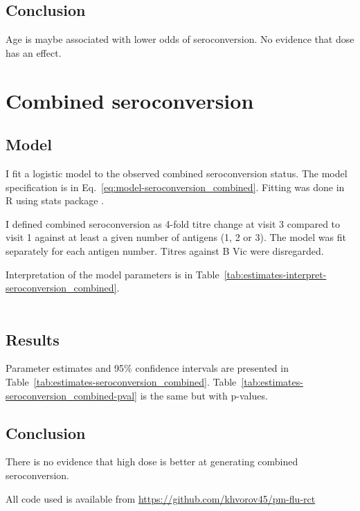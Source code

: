 \documentclass[11pt]{article}
\begin{document}
\subsection{Conclusion}

Age is maybe associated with lower odds of seroconversion. No evidence that
dose has an effect.

\section{Combined seroconversion}

\subsection{Model}

I fit a logistic model to the observed combined seroconversion status.
The model specification is in Eq.~\ref{eq:model-seroconversion_combined}.
Fitting was done in R using stats package \cite{R}.

I defined combined seroconversion as 4-fold titre change at visit 3 compared
to visit 1 against
at least a given number of antigens (1, 2 or 3). The model was fit separately
for each antigen number.
Titres against B Vic were disregarded.

Interpretation of the model parameters is in
Table~\ref{tab:estimates-interpret-seroconversion_combined}.

\begin{equation}
    \begin{gathered}
        \label{eq:model-seroconversion_combined}
        
    \end{gathered}
\end{equation}





\subsection{Results}

Parameter estimates and 95\% confidence intervals
are presented in Table~\ref{tab:estimates-seroconversion_combined}.
Table~\ref{tab:estimates-seroconversion_combined-pval} is the same but with
p-values.





\subsection{Conclusion}

There is no evidence that high dose is better at generating combined
seroconversion.




All code used is available from \url{https://github.com/khvorov45/pm-flu-rct}
\end{document}
